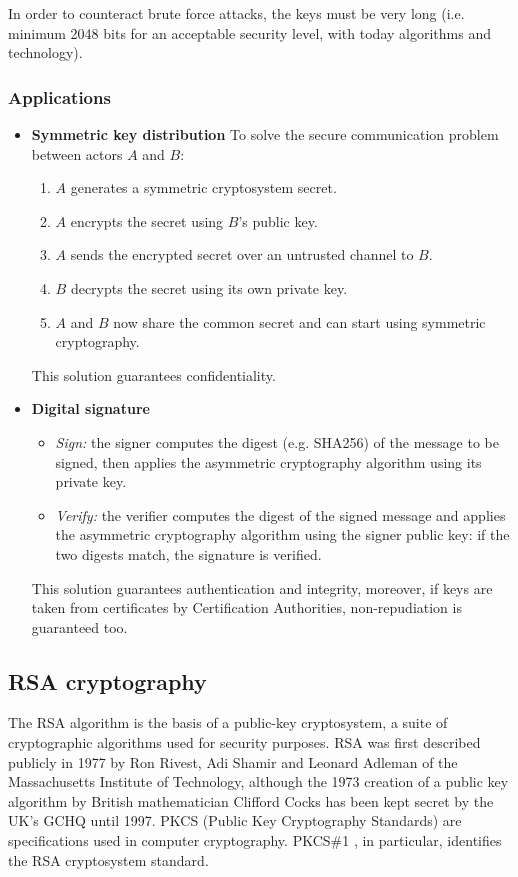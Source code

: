 In order to counteract brute force attacks, the keys must be very long (i.e.
minimum 2048 bits for an acceptable security level, with today algorithms and
technology).

\subsubsection{Applications}
\begin{itemize}
	\item \textbf{Symmetric key distribution}
		To solve the secure communication problem between actors $A$ and $B$:
		\begin{enumerate}
			\item $A$ generates a symmetric cryptosystem secret.
			\item $A$ encrypts the secret using $B$'s public key.
			\item $A$ sends the encrypted secret over an untrusted channel to $B$.
			\item $B$ decrypts the secret using its own private key.
			\item $A$ and $B$ now share the common secret and can start using symmetric
				cryptography.
		\end{enumerate}

		This solution guarantees confidentiality.

	\item \textbf{Digital signature}
		\begin{itemize}
			\item \emph{Sign:} the signer computes the digest (e.g. SHA256) of the
				message to be signed, then applies the asymmetric cryptography
				algorithm using its private key.
			\item \emph{Verify:} the verifier computes the digest of the signed message
				and applies the asymmetric cryptography algorithm using the signer
				public key: if the two digests match, the signature is
				verified.
		\end{itemize}
		This solution guarantees authentication and integrity, moreover, if keys are
		taken from certificates by Certification Authorities,
		non-repudiation is guaranteed too.
\end{itemize}

\subsection{RSA cryptography}
The RSA algorithm is the basis of a public-key cryptosystem, a suite of
cryptographic algorithms used for security purposes.
RSA was first described publicly in 1977 by Ron Rivest, Adi Shamir and Leonard
Adleman of the Massachusetts Institute of Technology, although the 1973
creation of a public key algorithm by British mathematician Clifford Cocks has
been kept secret by the UK's GCHQ until 1997.
PKCS (Public Key Cryptography Standards) are specifications used in computer
cryptography. PKCS\#1 \cite{rsa}, in particular, identifies the RSA
cryptosystem standard.
